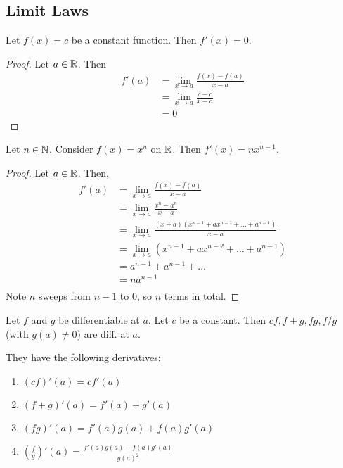 \documentclass{article}
\begin{document}
\subsection{Limit Laws}
\begin{cthm}
Let $f(x) = c$ be a constant function. Then $f'(x) = 0$.
\end{cthm}
\begin{proof}
    Let $a \in \mathbb{R}$. Then \begin{align*}
        f'(a) &= \lim_{x\to a} \frac{f(x) - f(a)}{x-a}\\
        &= \lim_{x\to a} \frac{c-c}{x-a}\\
        &= 0
    \end{align*}
\end{proof}
\begin{cthm}
Let $n \in \mathbb{N}$. Consider $f(x) = x^n$ on $\mathbb{R}$. Then $f'(x) = nx^{n-1}$.
\end{cthm}
\begin{proof}
    Let $a \in \mathbb{R}$. Then, \begin{align*}
        f'(a) &= \lim_{x\to a} \frac{f(x) - f(a)}{x-a}\\
        &= \lim_{x\to a} \frac{x^n - a^n}{x-a}\\
        &= \lim_{x\to a} \frac{(x-a)(x^{n-1} + ax^{n-2} + \dots + a^{n-1})}{x-a}\\
        &= \lim_{x\to a} (x^{n-1} + ax^{n-2} + \dots + a^{n-1})\\
        &= a^{n-1} + a^{n-1} + \dots \tag{polynomials are cts.}\\
        &= na^{n-1}\\
    \end{align*}
    Note $n$ sweeps from $n-1$ to $0$, so $n$ terms in total.
\end{proof}
\begin{cthm}[Theorem 28.3]
Let $f$ and $g$ be differentiable at $a$. Let $c$ be a constant. Then $cf, f+g, fg, f/g$ (with $g(a) \neq 0$) are diff. at $a$.

They have the following derivatives:
\begin{enumerate}
    \item $(cf)'(a) = cf'(a)$
    \item $(f+g)'(a) = f'(a) + g'(a)$
    \item $(fg)'(a) = f'(a)g(a) + f(a)g'(a)$
    \item $(\frac{f}{g})'(a) = \frac{f'(a)g(a) - f(a)g'(a)}{g(a)^2} $
\end{enumerate}
\end{cthm}
\end{document}
